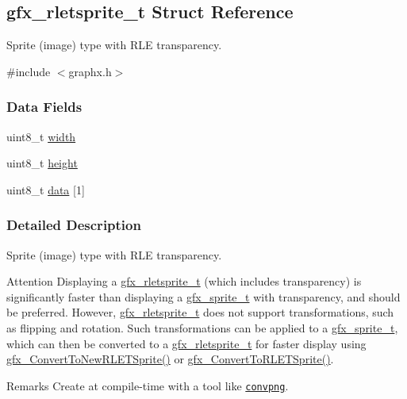 \hypertarget{structgfx__rletsprite__t}{}\subsection{gfx\+\_\+rletsprite\+\_\+t Struct Reference}
\label{structgfx__rletsprite__t}


Sprite (image) type with R\+LE transparency.  




{\ttfamily \#include $<$graphx.\+h$>$}

\subsubsection*{Data Fields}
\begin{DoxyCompactItemize}
\item 
uint8\+\_\+t \hyperlink{structgfx__rletsprite__t_a8b200b1870ef60d5a682d0a8bab71bd0}{width}
\item 
uint8\+\_\+t \hyperlink{structgfx__rletsprite__t_a08e8d294d6fe298330f0e5fde0ed817d}{height}
\item 
uint8\+\_\+t \hyperlink{structgfx__rletsprite__t_a66f60be1317945414d120b0690332f2a}{data} \mbox{[}1\mbox{]}
\end{DoxyCompactItemize}


\subsubsection{Detailed Description}
Sprite (image) type with R\+LE transparency. 

\begin{DoxyAttention}{Attention}
Displaying a \hyperlink{structgfx__rletsprite__t}{gfx\+\_\+rletsprite\+\_\+t} (which includes transparency) is significantly faster than displaying a \hyperlink{structgfx__sprite__t}{gfx\+\_\+sprite\+\_\+t} with transparency, and should be preferred. However, \hyperlink{structgfx__rletsprite__t}{gfx\+\_\+rletsprite\+\_\+t} does not support transformations, such as flipping and rotation. Such transformations can be applied to a \hyperlink{structgfx__sprite__t}{gfx\+\_\+sprite\+\_\+t}, which can then be converted to a \hyperlink{structgfx__rletsprite__t}{gfx\+\_\+rletsprite\+\_\+t} for faster display using \hyperlink{graphx_8h_ae7f27ad7ae83cab2f30582c2df711caa}{gfx\+\_\+\+Convert\+To\+New\+R\+L\+E\+T\+Sprite()} or \hyperlink{graphx_8h_a0c44bd4f12f482fa7343e9fd7edc1237}{gfx\+\_\+\+Convert\+To\+R\+L\+E\+T\+Sprite()}.
\end{DoxyAttention}
\begin{DoxyRemark}{Remarks}
Create at compile-\/time with a tool like \href{https://github.com/MattWaltz/convpng}{\tt convpng}. 
\end{DoxyRemark}


